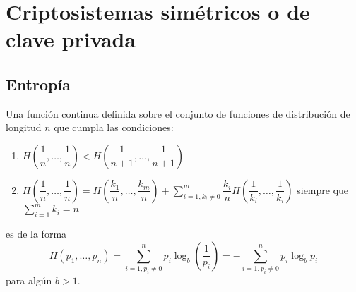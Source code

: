 
\chapter{Criptosistemas simétricos o de clave privada}
\section{Entropía}

\begin{teo}
    Una función continua definida sobre el conjunto de funciones de distribución de longitud $n$ que cumpla las condiciones:

    \begin{enumerate}[label=(\arabic*)]
        \item\label{item:l1-i1} $H\left(\dfrac{1}{n},\dots,\dfrac{1}{n}\right) < H\left(\dfrac{1}{n+1},\dots,\dfrac{1}{n+1}\right)$
        \item\label{item:l1-i2} $\displaystyle H\left(\dfrac{1}{n},\dots,\dfrac{1}{n}\right) = H\left(\dfrac{k_1}{n},\dots,\dfrac{k_m}{n}\right)+\sum_{i=1, k_i\neq 0}^m\dfrac{k_i}{n}H\left(\dfrac{1}{k_i},\dots,\dfrac{1}{k_i}\right)$ siempre que $\displaystyle \sum_{i=1}^mk_i=n$
    \end{enumerate}
    es de la forma
    $$H(p_1,\dots,p_n)=\sum_{i=1, p_i\ne 0}^np_i\log_b\left(\dfrac{1}{p_i}\right)=-\sum_{i=1, p_i\ne 0}^np_i\log_bp_i$$
    para algún $b>1$. 
\end{teo}


